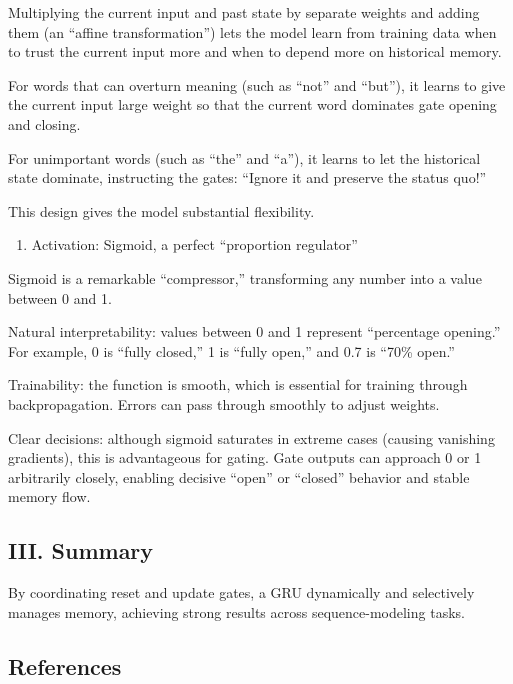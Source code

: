 Multiplying the current input and past state by separate weights and adding them (an ``affine transformation'') lets the model learn from training data when to trust the current input more and when to depend more on historical memory.

For words that can overturn meaning (such as ``not'' and ``but''), it learns to give the current input large weight so that the current word dominates gate opening and closing.

For unimportant words (such as ``the'' and ``a''), it learns to let the historical state dominate, instructing the gates: ``Ignore it and preserve the status quo!''

This design gives the model substantial flexibility.

\begin{enumerate}
\def\labelenumi{\arabic{enumi}.}
\setcounter{enumi}{2}
\tightlist
\item
  Activation: Sigmoid, a perfect ``proportion regulator''
\end{enumerate}

Sigmoid is a remarkable ``compressor,'' transforming any number into a value between 0 and 1.

Natural interpretability: values between 0 and 1 represent ``percentage opening.'' For example, 0 is ``fully closed,'' 1 is ``fully open,'' and 0.7 is ``70\% open.''

Trainability: the function is smooth, which is essential for training through backpropagation. Errors can pass through smoothly to adjust weights.

Clear decisions: although sigmoid saturates in extreme cases (causing vanishing gradients), this is advantageous for gating. Gate outputs can approach 0 or 1 arbitrarily closely, enabling decisive ``open'' or ``closed'' behavior and stable memory flow.

\hypertarget{iii.-summary}{%
\subsection{III. Summary}\label{iii.-summary}}

By coordinating reset and update gates, a GRU dynamically and selectively manages memory, achieving strong results across sequence-modeling tasks.

\FloatBarrier
{}
\hypertarget{references-20}{%
\subsection{References}\label{references-20}}

